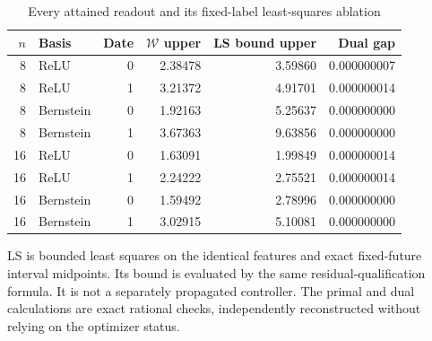 \begin{table}[htbp]
\centering
\caption{Every attained readout and its fixed-label least-squares ablation}\label{tab:readouts73}
{\small\setlength{\tabcolsep}{4pt}
\begin{tabular}{rlrrrr}
\hline
$n$ & Basis & Date & $\mathcal W$ upper & LS bound upper & Dual gap \\
\hline
8 & ReLU & 0 & 2.38478 & 3.59860 & 0.000000007 \\
8 & ReLU & 1 & 3.21372 & 4.91701 & 0.000000014 \\
8 & Bernstein & 0 & 1.92163 & 5.25637 & 0.000000000 \\
8 & Bernstein & 1 & 3.67363 & 9.63856 & 0.000000000 \\
16 & ReLU & 0 & 1.63091 & 1.99849 & 0.000000014 \\
16 & ReLU & 1 & 2.24222 & 2.75521 & 0.000000014 \\
16 & Bernstein & 0 & 1.59492 & 2.78996 & 0.000000000 \\
16 & Bernstein & 1 & 3.02915 & 5.10081 & 0.000000000 \\
\hline
\end{tabular}}
\par\smallskip
{\footnotesize LS is bounded least squares on the identical features and exact fixed-future interval midpoints. Its bound is evaluated by the same residual-qualification formula. It is not a separately propagated controller. The primal and dual calculations are exact rational checks, independently reconstructed without relying on the optimizer status.}
\end{table}
